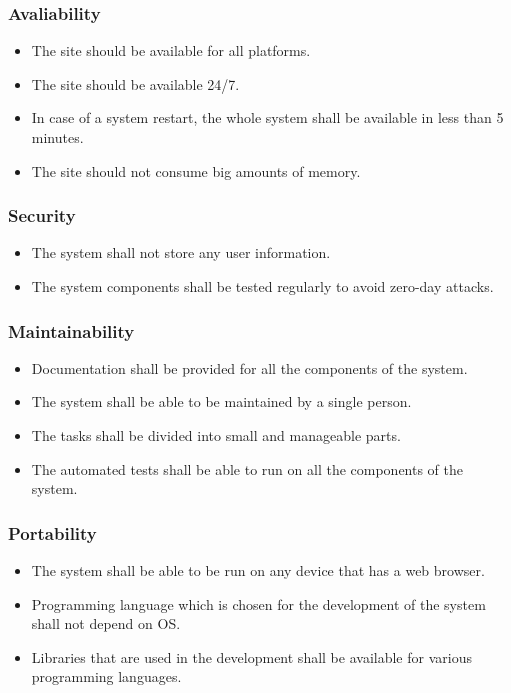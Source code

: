 \documentclass[a4paper]{article}
\begin{document}
            \subsubsection{Avaliability}
            \begin{itemize}
                \item The site should be available for all platforms.
                \item The site should be available 24/7.
                \item In case of a system restart, the whole system shall be available in less than 5 minutes.
                \item The site should not consume big amounts of memory.
            \end{itemize}
            
            \subsubsection{Security}
            \begin{itemize}
                \item The system shall not store any user information.
                \item The system components shall be tested regularly to avoid zero-day attacks.
            \end{itemize}

            \subsubsection{Maintainability}
            \begin{itemize}
                \item Documentation shall be provided for all the components of the system.
                \item The system shall be able to be maintained by a single person.
                \item The tasks shall be divided into small and manageable parts.
                \item The automated tests shall be able to run on all the components of the system.
            \end{itemize}

            \subsubsection{Portability}
            \begin{itemize}
                \item The system shall be able to be run on any device that has a web browser.
                \item Programming language which is chosen for the development of the system shall not depend on OS.
                \item Libraries that are used in the development shall be available for various programming languages.
            \end{itemize}
\end{document}
